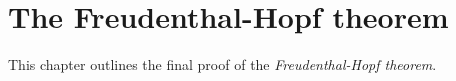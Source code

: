 \chapter{The Freudenthal-Hopf theorem}

This chapter outlines the final proof of the \emph{Freudenthal-Hopf theorem}.
